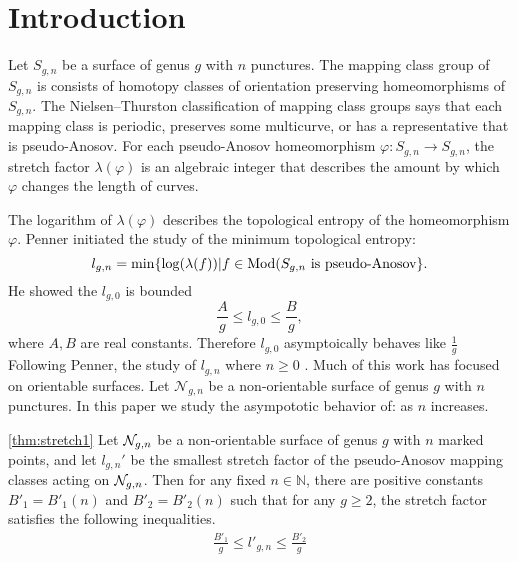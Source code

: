 \section{Introduction}
\label{sec:introduction}

Let $S_{g,n}$ be a surface of genus $g$ with $n$ punctures.  The mapping class group of $S_{g,n}$ is consists of homotopy classes of orientation preserving homeomorphisms of $S_{g,n}$.  The Nielsen--Thurston classification of mapping class groups says that each mapping class is periodic, preserves some multicurve, or has a representative that is pseudo-Anosov.  For each pseudo-Anosov homeomorphism $\varphi:S_{g,n}\rightarrow S_{g,n}$, the stretch factor $\lambda(\varphi)$ is an algebraic integer that describes the amount by which $\varphi$ changes the length of curves.%

The logarithm of $\lambda(\varphi)$ describes the topological entropy of the homeomorphism $\varphi$.  Penner \cite{penner1991bounds} initiated the study of the minimum topological entropy:
$$l_{g,n}=\min\{\log(\lambda(f)) | f\in\operatorname{Mod}(S_{g,n}\text{ is pseudo-Anosov}\}.$$ 
He showed the $l_{g,0}$ is bounded $$\frac{A}{g}\leq l_{g,0}\leq \frac{B}{g},$$ where $A,B$ are real constants.  Therefore $l_{g,0}$ asymptoically behaves like $\frac{1}{g}$  Following Penner, the study of $l_{g,n}$ where $n\geq 0$  .  Much of this work has focused on orientable surfaces.  Let $\mathcal{N}_{g,n}$ be a non-orientable surface of genus $g$ with $n$ punctures.  In this paper we study the asympototic behavior of:
as $n$ increases.

\begin{manualtheorem}{\ref{thm:stretch1}}
  Let $\mathcal{N}_{g,n}$ be a non-orientable surface of genus $g$ with $n$ marked points, and let $l_{g,n}'$ be
  the smallest stretch factor of the pseudo-Anosov mapping classes acting on $\mathcal{N}_{g,n}$.
  Then for any fixed $n \in \mathbb{N}$, there are positive constants $B'_1 = B'_1(n)$ and $B'_2 = B'_2(n)$ such
  that for any $g \geq 2$, the stretch factor satisfies the following inequalities.
  \begin{align*}
    \frac{B'_1}{g} \leq l'_{g,n} \leq \frac{B'_2}{g}
  \end{align*}
\end{manualtheorem}

